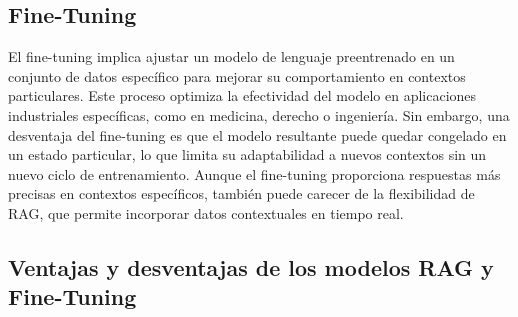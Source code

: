   \subsection{Fine-Tuning}
  El fine-tuning implica ajustar un modelo de lenguaje preentrenado en un conjunto de datos específico para mejorar su comportamiento en contextos particulares. Este proceso optimiza la efectividad del modelo en aplicaciones industriales específicas, como en medicina, derecho o ingeniería. Sin embargo, una desventaja del fine-tuning es que el modelo resultante puede quedar congelado en un estado particular, lo que limita su adaptabilidad a nuevos contextos sin un nuevo ciclo de entrenamiento.
  Aunque el fine-tuning proporciona respuestas más precisas en contextos específicos, también puede carecer de la flexibilidad de RAG, que permite incorporar datos contextuales en tiempo real.
   
  \newpage
\subsection{Ventajas y desventajas de los modelos RAG y Fine-Tuning}
  

